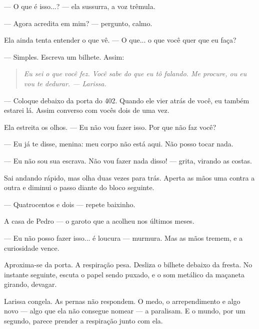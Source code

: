 — O que é isso...? — ela sussurra, a voz trêmula.

— Agora acredita em mim? — pergunto, calmo.

Ela ainda tenta entender o que vê.  
— O que... o que você quer que eu faça?

— Simples. Escreva um bilhete. Assim:  
\begin{quote}
\emph{Eu sei o que você fez.  
Você sabe do que eu tô falando.  
Me procure, ou eu vou te dedurar.  
— Larissa.}
\end{quote}

— Coloque debaixo da porta do 402.  
Quando ele vier atrás de você, eu também estarei lá.  
Assim converso com vocês dois de uma vez.

Ela estreita os olhos.  
— Eu não vou fazer isso. Por que não faz você?

— Eu já te disse, menina: meu corpo não está aqui.  
Não posso tocar nada.  

— Eu não sou sua escrava. Não vou fazer nada disso! — grita, virando as costas.

Sai andando rápido, mas olha duas vezes para trás. Aperta as mãos uma contra a outra e diminui o passo diante do bloco seguinte.

— Quatrocentos e dois — repete baixinho.

A casa de Pedro — o garoto que a acolheu nos últimos meses.

— Eu não posso fazer isso... é loucura — murmura.  
Mas as mãos tremem, e a curiosidade vence.

Aproxima-se da porta.  
A respiração pesa.  
Desliza o bilhete debaixo da fresta.  
No instante seguinte, escuta o papel sendo puxado, e o som metálico da maçaneta girando, devagar.  

Larissa congela.  
As pernas não respondem.  
O medo, o arrependimento e algo novo — algo que ela não consegue nomear — a paralisam.  
E o mundo, por um segundo, parece prender a respiração junto com ela.
